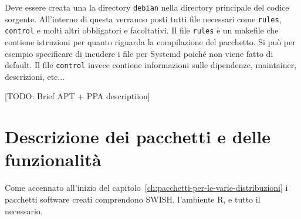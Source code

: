 \documentclass[10pt,titlepage,twoside,a4paper]{report}
\begin{document}
Deve essere creata una la directory \texttt{debian} nella directory principale 
del codice sorgente. All'interno di questa verranno posti tutti file 
necessari come \texttt{rules}, \texttt{control} e molti altri obbligatori e 
facoltativi. Il file \texttt{rules} è un makefile che contiene istruzioni per 
quanto riguarda la compilazione del pacchetto. Si può per esempio specificare 
di incudere i file per Systemd poiché non viene fatto di default. Il file 
\texttt{control} invece contiene informazioni sulle dipendenze, maintainer, 
descrizioni, etc... 

[TODO: Brief APT + PPA descriptiion]


\section{Descrizione dei pacchetti e delle funzionalità}
Come accennato all'inizio del capitolo~\ref{ch:pacchetti-per-le-varie-distribuzioni}
i pacchetti software creati comprendono SWISH, l'ambiente R, e tutto il 
necessario.
\end{document}
